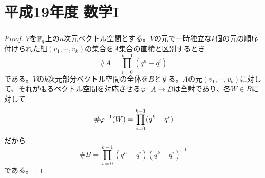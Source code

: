 \section{平成19年度 数学I}

\subsubsection{}%
\begin{proof}
  $V$を${\mathbb F}_q$上の$n$次元ベクトル空間とする。$V$の元で一時独立な$k$個の元の順序付けられた組$(v_1, \cdots , v_k)$の集合を$A$集合の直積と区別するとき
  \[
  \# A = \prod_{i = 0}^{k-1} (q^n - q^i)
  \]
  である。$V$の$k$次元部分ベクトル空間の全体を$B$とする。$A$の元$(v_1, \cdots , v_k)$に対して、それが張るベクトル空間を対応させる${\varphi} \colon A \to B$は全射であり、各$W \in B$に対して
  \[
  \# {\varphi}^{-1}(W) = \prod_{i=0}^{k-1} (q^k - q^i)
  \]
  だから
  \[
    \# B = \prod_{i=0}^{k-1} (q^n - q^i)(q^k - q^i)^{-1}
  \]
  である。
\end{proof}

\newpage


